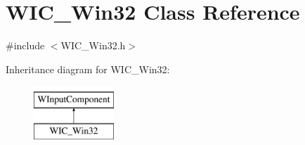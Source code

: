 \hypertarget{class_w_i_c___win32}{}\section{W\+I\+C\+\_\+\+Win32 Class Reference}
\label{class_w_i_c___win32}


{\ttfamily \#include $<$W\+I\+C\+\_\+\+Win32.\+h$>$}

Inheritance diagram for W\+I\+C\+\_\+\+Win32\+:\begin{figure}[H]
\begin{center}
\leavevmode
\includegraphics[height=2.000000cm]{class_w_i_c___win32}
\end{center}
\end{figure}
